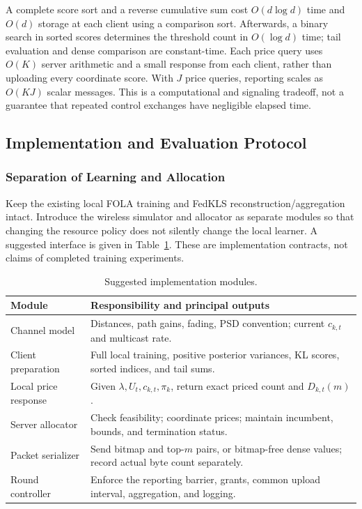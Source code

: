 A complete score sort and a reverse cumulative sum cost $O(d\log d)$ time and $O(d)$ storage at each client using a comparison sort. Afterwards, a binary search in sorted scores determines the threshold count in $O(\log d)$ time; tail evaluation and dense comparison are constant-time. Each price query uses $O(K)$ server arithmetic and a small response from each client, rather than uploading every coordinate score. With $J$ price queries, reporting scales as $O(KJ)$ scalar messages. This is a computational and signaling tradeoff, not a guarantee that repeated control exchanges have negligible elapsed time.


\subsection{Implementation and Evaluation Protocol}
\label{fkl:sec:implementation}
\subsubsection{Separation of Learning and Allocation}
Keep the existing local FOLA training and FedKLS reconstruction/aggregation intact. Introduce the wireless simulator and allocator as separate modules so that changing the resource policy does not silently change the local learner. A suggested interface is given in Table~\ref{fkl:tab:modules}. These are implementation contracts, not claims of completed training experiments.

\begin{table}[t]
\caption{Suggested implementation modules.}
\label{fkl:tab:modules}
\centering\footnotesize
\begin{tabular}{@{}>{\raggedright\arraybackslash}p{}>{\raggedright\arraybackslash}p{}@{}}
\toprule
Module & Responsibility and principal outputs\\
\midrule
Channel model & Distances, path gains, fading, PSD convention; current $c_{k,t}$ and multicast rate.\\
Client preparation & Full local training, positive posterior variances, KL scores, sorted indices, and tail sums.\\
Local price response & Given $\lambda,U_t,c_{k,t},\pi_k$, return exact priced count and $D_{k,t}(m)$.\\
Server allocator & Check feasibility; coordinate prices; maintain incumbent, bounds, and termination status.\\
Packet serializer & Send bitmap and top-$m$ pairs, or bitmap-free dense values; record actual byte count separately.\\
Round controller & Enforce the reporting barrier, grants, common upload interval, aggregation, and logging.\\
\bottomrule
\end{tabular}
\end{table}

